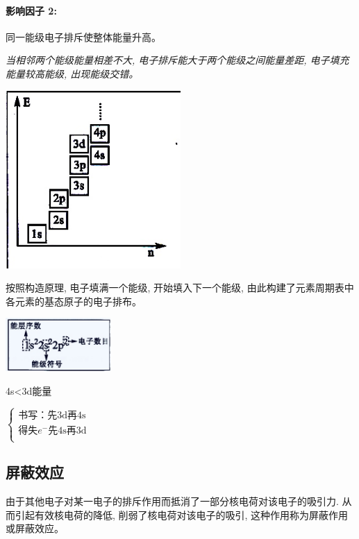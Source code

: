 \documentclass[10pt,cn]{elegantbook}
\begin{document}
	\paragraph*{影响因子 2: }同一能级电子排斥使整体能量升高。
	
	\textit{当相邻两个能级能量相差不大, 电子排斥能大于两个能级之间能量差距, 电子填充能量较高能级, 出现能级交错。}
		\begin{center}
		\includegraphics[max width=0.5\textwidth]{image/c43-1.jpg}
	\end{center}
	
	
	按照构造原理, 电子填满一个能级, 开始填入下一个能级, 由此构建了元素周期表中各元素的基态原子的电子排布。
	
		\begin{center}
		\includegraphics[max width=0.3\textwidth]{image/c44.jpg}
	\end{center}
	
	
	4s<3d能量
	
			$
	
	\left\{
	\begin{aligned}
		\text{书写：先3d再4s}  \\
		\text{得失}e^{-}   \text{先4s再3d}\\
	\end{aligned}
	\right.
	$
	
	\subsection{屏蔽效应}
	
	由于其他电子对某一电子的排斥作用而抵消了一部分核电荷对该电子的吸引力. 从而引起有效核电荷的降低, 削弱了核电荷对该电子的吸引, 这种作用称为屏蔽作用或屏蔽效应。
	
\end{document}
